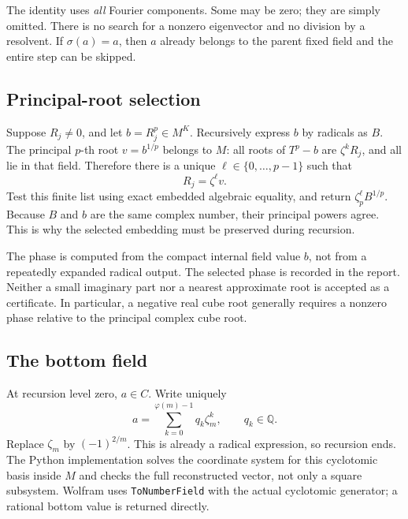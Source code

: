 \documentclass[11pt,letterpaper]{article}
\newcommand{\Q}{\mathbb Q}\newcommand{\C}{\mathbb C}
\newcommand{\code}[1]{\texttt{#1}}
\theoremstyle{definition}\newtheorem{definition}[theorem]{Definition}
\theoremstyle{remark}\newtheorem{remark}[theorem]{Remark}
\begin{document}
The identity uses \emph{all} Fourier components. Some may be zero; they are
simply omitted. There is no search for a nonzero eigenvector and no division
by a resolvent. If \(\sigma(a)=a\), then \(a\) already belongs to the parent
fixed field and the entire step can be skipped.

\subsection{Principal-root selection}

Suppose \(R_j\ne0\), and let \(b=R_j^p\in M^K\). Recursively express \(b\)
by radicals as \(B\). The principal \(p\)-th root \(v=b^{1/p}\) belongs to
\(M\): all roots of \(T^p-b\) are \(\zeta^kR_j\), and all lie in that field.
Therefore there is a unique \(\ell\in\{0,\ldots,p-1\}\) such that
\begin{equation}
                  R_j=\zeta^\ell v.                         \label{eq:phase}
\end{equation}
Test this finite list using exact embedded algebraic equality, and return
\(\zeta_p^\ell B^{1/p}\). Because \(B\) and \(b\) are the same complex number,
their principal powers agree. This is why the selected embedding must be
preserved during recursion.

The phase is computed from the compact internal field value \(b\), not from
a repeatedly expanded radical output. The selected phase is recorded in the
report. Neither a small imaginary part nor a nearest approximate root is
accepted as a certificate. In particular, a negative real cube root generally
requires a nonzero phase relative to the principal complex cube root.

\subsection{The bottom field}

At recursion level zero, \(a\in C\). Write uniquely
\begin{equation}
              a=\sum_{k=0}^{\varphi(m)-1}q_k\zeta_m^k,
              \qquad q_k\in\Q.                              \label{eq:bottom}
\end{equation}
Replace \(\zeta_m\) by \((-1)^{2/m}\). This is already a radical expression,
so recursion ends. The Python implementation solves the coordinate system
for this cyclotomic basis inside \(M\) and checks the full reconstructed
vector, not only a square subsystem. Wolfram uses \code{ToNumberField} with
the actual cyclotomic generator; a rational bottom value is returned directly.
\end{document}
